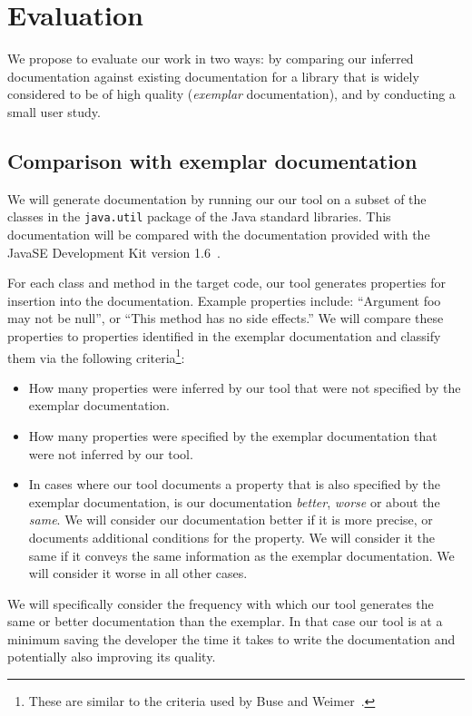 \section{Evaluation}

We propose to evaluate our work in two ways: by comparing our inferred
documentation against existing documentation for a library that is widely
considered to be of high quality (\textit{exemplar} documentation), and by
conducting a small user study.

\subsection{Comparison with exemplar documentation}

We will generate documentation by running our our tool on a subset of the
classes in the \texttt{java.util} package of the Java standard libraries. This
documentation will be compared with the documentation provided with the
Java\texttrademark SE Development Kit version 1.6~\cite{JDK6}.

For each class and method in the target code, our tool generates properties for
insertion into the documentation. Example properties include: ``Argument foo
may not be null'', or ``This method has no side effects.'' We will compare
these properties to properties identified in the exemplar documentation and
classify them via the following criteria\footnote{These are similar to the
criteria used by Buse and Weimer~\cite{autodoc}.}:

\begin{itemize}
\item How many properties were inferred by our tool that were not specified by
  the exemplar documentation.
\item How many properties were specified by the exemplar documentation that
  were not inferred by our tool.
\item In cases where our tool documents a property that is also specified by
  the exemplar documentation, is our documentation \textit{better},
  \textit{worse} or about the \textit{same}. We will consider our documentation
  better if it is more precise, or documents additional conditions for the
  property. We will consider it the same if it conveys the same information as
  the exemplar documentation. We will consider it worse in all other cases.
\end{itemize}

We will specifically consider the frequency with which our tool generates the
same or better documentation than the exemplar. In that case our tool is at a
minimum saving the developer the time it takes to write the documentation and
potentially also improving its quality.

